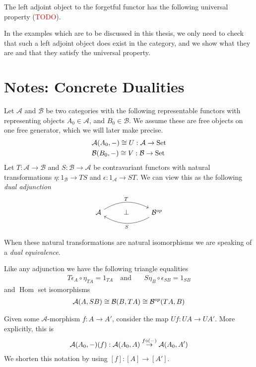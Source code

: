 \documentclass[12pt,a4paper]{article}
\DeclareMathOperator{\Hom}{Hom}
\DeclareMathOperator{\Set}{Set}
\def\HomA{\ensuremath\mathcal{A}}
\def\HomB{\ensuremath\mathcal{B}}
\begin{document}
The left adjoint object to the forgetful functor has the following universal property (\textcolor{red}{TODO}).

In the  examples which are to be discussed in this thesis, we only need to check that such a left adjoint object does exist in the category, and we show what they are and that they satisfy the universal property.
\section{Notes: Concrete Dualities}	

Let $\mathcal{A}$ and $\mathcal{B}$ be two categories with the following representable functors with representing objects $A_0 \in \mathcal{A}$, and $B_0 \in \mathcal{B}$. We assume these are free objects on one free generator, which we will later make precise. 
\begin{align*}
	&\HomA(A_0, -) \cong U: \mathcal{A} \to \Set\\
	&\HomB(B_0, -) \cong V: \mathcal{B} \to \Set\\
\end{align*}
Let $T: \mathcal{A} \to \mathcal{B}$ and $S: \mathcal{B} \to \mathcal{A}$ be contravariant functors with natural transformations $\eta: 1_\mathcal{B} \to TS$ and $\epsilon :  1_\mathcal{A} \to ST$. We can view this as the following \emph{dual adjunction}
\[\begin{tikzcd}
	{\mathcal{A}} & \bot & {\mathcal{B}^{op}}
	\arrow["T", bend left, from=1-1, to=1-3]
	\arrow["S", bend left, from=1-3, to=1-1]
\end{tikzcd}\]

When these natural transformations are natural isomorphisms we are speaking of a \emph{dual equivalence}. 

Like any adjunction we have the following triangle equalities \begin{align*}
	&T{\epsilon_A} \circ \eta_{TA} = 1_{TA} \ &\text{and}& \ &  S{\eta_B} \circ \epsilon_{SB} = 1_{SB}&
\end{align*}
and $\Hom$ set isomorphisms \begin{align*}
	\HomA(A, SB) \cong \HomB(B, TA) \cong \HomB^{op}(TA,B)
\end{align*}

Given some $\mathcal{A}$-morphism $f: A\to A'$, consider the map $Uf: UA \to UA'$. More explicitly, this is \begin{align*}
 	\HomA(A_0, -) (f) : \HomA(A_0, A) \stackrel{f \circ (-)}{\to} \HomA(A_0, A')
 \end{align*}
We shorten this notation by using $[f]: [A] \to [A']$.
\end{document}
